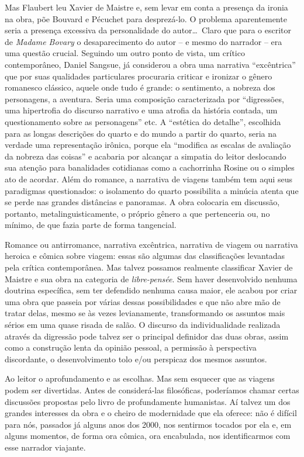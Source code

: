 Mas Flaubert leu Xavier de Maistre e, sem levar em conta a presença da
ironia na obra, põe Bouvard e Pécuchet para desprezá-lo. O problema
aparentemente seria a presença excessiva da personalidade do autor\ldots\
Claro que para o escritor de \textit{Madame Bovary} o desaparecimento
do autor -- e mesmo do narrador -- era uma questão crucial. Seguindo
um outro ponto de vista, um crítico contemporâneo, Daniel Sangsue, já considerou a obra
uma narrativa ``excêntrica'' que por suas qualidades particulares
procuraria criticar e ironizar o gênero romanesco clássico, aquele onde
tudo é grande: o sentimento, a nobreza dos personagens, a aventura.
Seria uma composição caracterizada por ``digressões, uma hipertrofia do
discurso narrativo e uma atrofia da história contada, um questionamento
sobre as personagens'' etc. A ``estética do detalhe'', escolhida para as
longas descrições do quarto e do mundo a partir do quarto, seria na
verdade uma representação irônica, porque ela ``modifica as escalas de
avaliação da nobreza das coisas'' e acabaria por alcançar a simpatia do
leitor deslocando sua atenção para banalidades cotidianas como a
cachorrinha Rosine ou o simples ato de acordar. Além do romance, a
narrativa de viagens também tem aqui seus paradigmas questionados: o
isolamento do quarto possibilita a minúcia atenta que se perde nas
grandes distâncias e panoramas. A obra colocaria em discussão,
portanto, metalinguisticamente, o próprio gênero a que pertenceria ou,
no mínimo, de que fazia parte de forma tangencial.

Romance ou antirromance, narrativa excêntrica, narrativa de viagem ou
narrativa heroica e cômica sobre viagem: essas são algumas das
classificações levantadas pela crítica contemporânea. Mas talvez
possamos realmente classificar Xavier de Maistre e sua obra na
categoria de \textit{libre-pensée}. Sem haver desenvolvido nenhuma
doutrina específica, sem ter defendido nenhuma causa maior, ele acabou
por criar uma obra que passeia por várias dessas possibilidades e que
não abre mão de tratar delas, mesmo se às vezes levianamente,
transformando os assuntos mais sérios em uma quase risada de salão.  O
discurso da individualidade realizada através da digressão pode talvez
ser o principal definidor das duas obras, assim como a construção lenta
da opinião pessoal, a permissão à perspectiva discordante, o
desenvolvimento tolo e/ou perspicaz dos mesmos assuntos. 

Ao leitor o aprofundamento e as escolhas. Mas sem esquecer que as
viagens podem ser divertidas. Antes de considerá-las filosóficas,
poderíamos chamar certas discussões propostas pelo livro de
profundamente humanistas. Aí talvez um dos grandes interesses da obra e
o cheiro de modernidade que ela oferece: não é difícil para
nós, passados já alguns anos dos 2000, nos sentirmos tocados por ela e,
em alguns momentos, de forma ora cômica, ora encabulada, nos
identificarmos com esse narrador viajante.

